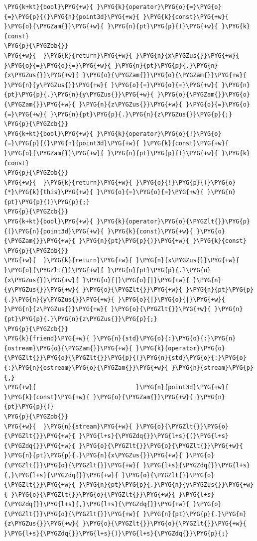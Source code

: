 \begin{codeblockbg}
\begin{Verbatim}[commandchars=\\\{\},breaklines=true,breakanywhere=true,fontsize=\codefont,xleftmargin=17bp]
\PYG{k+kt}{bool}\PYG{+w}{ }\PYG{k}{operator}\PYG{o}{=}\PYG{o}{=}\PYG{p}{(}\PYG{n}{point3d}\PYG{+w}{ }\PYG{k}{const}\PYG{+w}{ }\PYG{o}{\PYGZam{}}\PYG{+w}{ }\PYG{n}{pt}\PYG{p}{)}\PYG{+w}{ }\PYG{k}{const}
\PYG{p}{\PYGZob{}}
\PYG{+w}{  }\PYG{k}{return}\PYG{+w}{ }\PYG{n}{x\PYGZus{}}\PYG{+w}{ }\PYG{o}{=}\PYG{o}{=}\PYG{+w}{ }\PYG{n}{pt}\PYG{p}{.}\PYG{n}{x\PYGZus{}}\PYG{+w}{ }\PYG{o}{\PYGZam{}}\PYG{o}{\PYGZam{}}\PYG{+w}{ }\PYG{n}{y\PYGZus{}}\PYG{+w}{ }\PYG{o}{=}\PYG{o}{=}\PYG{+w}{ }\PYG{n}{pt}\PYG{p}{.}\PYG{n}{y\PYGZus{}}\PYG{+w}{ }\PYG{o}{\PYGZam{}}\PYG{o}{\PYGZam{}}\PYG{+w}{ }\PYG{n}{z\PYGZus{}}\PYG{+w}{ }\PYG{o}{=}\PYG{o}{=}\PYG{+w}{ }\PYG{n}{pt}\PYG{p}{.}\PYG{n}{z\PYGZus{}}\PYG{p}{;}
\PYG{p}{\PYGZcb{}}
\PYG{k+kt}{bool}\PYG{+w}{ }\PYG{k}{operator}\PYG{o}{!}\PYG{o}{=}\PYG{p}{(}\PYG{n}{point3d}\PYG{+w}{ }\PYG{k}{const}\PYG{+w}{ }\PYG{o}{\PYGZam{}}\PYG{+w}{ }\PYG{n}{pt}\PYG{p}{)}\PYG{+w}{ }\PYG{k}{const}
\PYG{p}{\PYGZob{}}
\PYG{+w}{  }\PYG{k}{return}\PYG{+w}{ }\PYG{o}{!}\PYG{p}{(}\PYG{o}{*}\PYG{k}{this}\PYG{+w}{ }\PYG{o}{=}\PYG{o}{=}\PYG{+w}{ }\PYG{n}{pt}\PYG{p}{)}\PYG{p}{;}
\PYG{p}{\PYGZcb{}}
\PYG{k+kt}{bool}\PYG{+w}{ }\PYG{k}{operator}\PYG{o}{\PYGZlt{}}\PYG{p}{(}\PYG{n}{point3d}\PYG{+w}{ }\PYG{k}{const}\PYG{+w}{ }\PYG{o}{\PYGZam{}}\PYG{+w}{ }\PYG{n}{pt}\PYG{p}{)}\PYG{+w}{ }\PYG{k}{const}
\PYG{p}{\PYGZob{}}
\PYG{+w}{  }\PYG{k}{return}\PYG{+w}{ }\PYG{n}{x\PYGZus{}}\PYG{+w}{ }\PYG{o}{\PYGZlt{}}\PYG{+w}{ }\PYG{n}{pt}\PYG{p}{.}\PYG{n}{x\PYGZus{}}\PYG{+w}{ }\PYG{o}{|}\PYG{o}{|}\PYG{+w}{ }\PYG{n}{y\PYGZus{}}\PYG{+w}{ }\PYG{o}{\PYGZlt{}}\PYG{+w}{ }\PYG{n}{pt}\PYG{p}{.}\PYG{n}{y\PYGZus{}}\PYG{+w}{ }\PYG{o}{|}\PYG{o}{|}\PYG{+w}{ }\PYG{n}{z\PYGZus{}}\PYG{+w}{ }\PYG{o}{\PYGZlt{}}\PYG{+w}{ }\PYG{n}{pt}\PYG{p}{.}\PYG{n}{z\PYGZus{}}\PYG{p}{;}
\PYG{p}{\PYGZcb{}}
\PYG{k}{friend}\PYG{+w}{ }\PYG{n}{std}\PYG{o}{:}\PYG{o}{:}\PYG{n}{ostream}\PYG{o}{\PYGZam{}}\PYG{+w}{ }\PYG{k}{operator}\PYG{o}{\PYGZlt{}}\PYG{o}{\PYGZlt{}}\PYG{p}{(}\PYG{n}{std}\PYG{o}{:}\PYG{o}{:}\PYG{n}{ostream}\PYG{o}{\PYGZam{}}\PYG{+w}{ }\PYG{n}{stream}\PYG{p}{,}
\PYG{+w}{                            }\PYG{n}{point3d}\PYG{+w}{ }\PYG{k}{const}\PYG{+w}{ }\PYG{o}{\PYGZam{}}\PYG{+w}{ }\PYG{n}{pt}\PYG{p}{)}
\PYG{p}{\PYGZob{}}
\PYG{+w}{  }\PYG{n}{stream}\PYG{+w}{ }\PYG{o}{\PYGZlt{}}\PYG{o}{\PYGZlt{}}\PYG{+w}{ }\PYG{l+s}{\PYGZdq{}}\PYG{l+s}{(}\PYG{l+s}{\PYGZdq{}}\PYG{+w}{ }\PYG{o}{\PYGZlt{}}\PYG{o}{\PYGZlt{}}\PYG{+w}{ }\PYG{n}{pt}\PYG{p}{.}\PYG{n}{x\PYGZus{}}\PYG{+w}{ }\PYG{o}{\PYGZlt{}}\PYG{o}{\PYGZlt{}}\PYG{+w}{ }\PYG{l+s}{\PYGZdq{}}\PYG{l+s}{,}\PYG{l+s}{\PYGZdq{}}\PYG{+w}{ }\PYG{o}{\PYGZlt{}}\PYG{o}{\PYGZlt{}}\PYG{+w}{ }\PYG{n}{pt}\PYG{p}{.}\PYG{n}{y\PYGZus{}}\PYG{+w}{ }\PYG{o}{\PYGZlt{}}\PYG{o}{\PYGZlt{}}\PYG{+w}{ }\PYG{l+s}{\PYGZdq{}}\PYG{l+s}{,}\PYG{l+s}{\PYGZdq{}}\PYG{+w}{ }\PYG{o}{\PYGZlt{}}\PYG{o}{\PYGZlt{}}\PYG{+w}{ }\PYG{n}{pt}\PYG{p}{.}\PYG{n}{z\PYGZus{}}\PYG{+w}{ }\PYG{o}{\PYGZlt{}}\PYG{o}{\PYGZlt{}}\PYG{+w}{ }\PYG{l+s}{\PYGZdq{}}\PYG{l+s}{)}\PYG{l+s}{\PYGZdq{}}\PYG{p}{;}

\end{Verbatim}
\end{codeblockbg}
